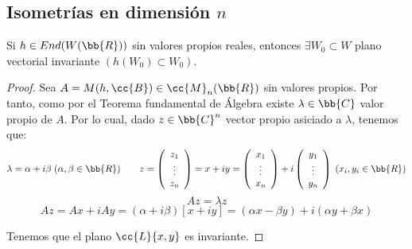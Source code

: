 \subsection{Isometrías en dimensión $n$}

\begin{prop}
    Si $h\in End(W(\bb{R}))$ sin valores propios reales, entonces $\exists W_0\subset W$ plano vectorial invariante $(h(W_0)\subset W_0)$.
\end{prop}
\begin{proof}
    Sea $A=M(h,\cc{B})\in \cc{M}_n(\bb{R})$ sin valores propios. Por tanto, como por el Teorema fundamental de Álgebra existe $\lambda\in \bb{C}$ valor propio de $A$. Por lo cual, dado $z\in \bb{C}^n$ vector propio asiciado a $\lambda$, tenemos que:
    \begin{equation*}
        \lambda = \alpha+i\beta \; (\alpha,\beta \in \bb{R})
        \qquad
        z=\left(\begin{array}{c}
            z_1 \\ \vdots \\ z_n
        \end{array}\right) = x+iy = \left(\begin{array}{c}
            x_1 \\ \vdots \\ x_n
        \end{array}\right) +i \left(\begin{array}{c}
            y_1 \\ \vdots\\  y_n
        \end{array}\right) \; (x_i,y_i\in \bb{R})
    \end{equation*}
    \begin{equation*}
        Az = \lambda z
    \end{equation*}
    \begin{equation*}
        Az = Ax+iAy = (\alpha+i\beta)[x+iy] = (\alpha x - \beta y)+i(\alpha y +\beta x)
    \end{equation*}

    Tenemos que el plano $\cc{L}\{x,y\}$ es invariante.
\end{proof}

